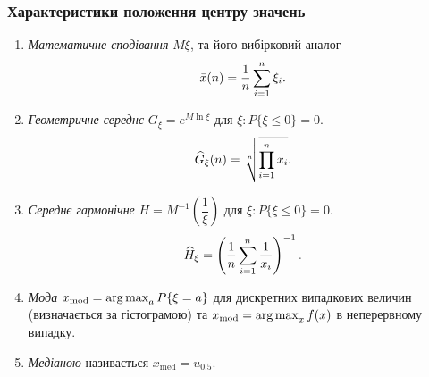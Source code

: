 \subsubsection{Характеристики положення центру значень}
\begin{enumerate}
	\item \textit{Математичне сподівання} $M\xi$, та його вибірковий аналог \[\bar{x}(n) = \dfrac{1}{n}\displaystyle\sum\limits_{i=1}^n \xi_i.\]
	\item \textit{Геометричне середнє} $G_\xi = e^{M \ln \xi}$ для $\xi: P\{\xi \le 0\} = 0$. \[\widehat{G}_\xi(n) = \sqrt[n]{\displaystyle\prod\limits_{i=1}^n x_i}.\]
	\item \textit{Середнє гармонічне} $H = M^{-1}\left(\dfrac{1}{\xi}\right)$ для $\xi: P\{\xi \le 0\} = 0$. \[\widehat{H}_\xi = \left( \dfrac{1}{n} \displaystyle\sum\limits_{i=1}^n \dfrac{1}{x_i}\right)^{-1}.\]
	\item \textit{Мода} $x_{\text{mod}}=\operatorname*{arg\,max}_a P\{\xi = a\}$ для дискретних випадкових величин (визначається за гістограмою) та $x_{\text{mod}}=\operatorname*{arg\,max}_x f(x)$ в неперервному випадку.
	\item \textit{Медіаною} називається $x_\text{med} = u_{0.5}$.
\end{enumerate}